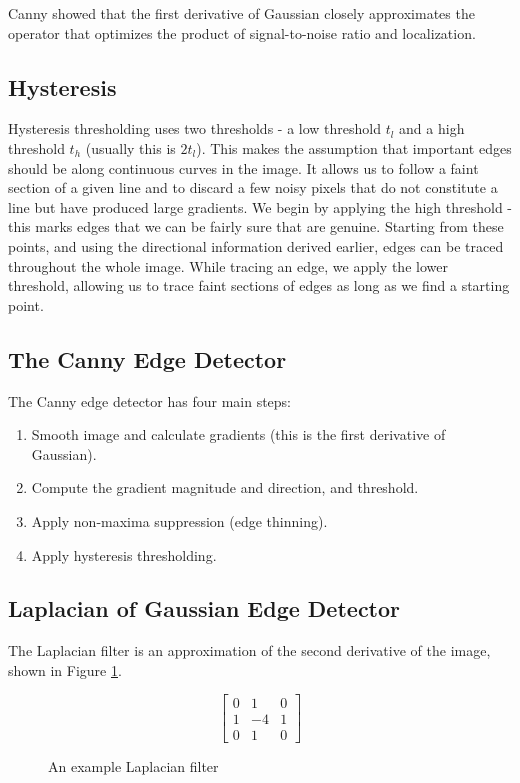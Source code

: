 \documentclass{article}
\begin{document}
	Canny showed that the first derivative of Gaussian closely approximates the operator that optimizes the product of signal-to-noise ratio and localization.

	\subsection{Hysteresis}
	Hysteresis thresholding uses two thresholds - a low threshold $t_{l}$ and a high threshold $t_{h}$ (usually this is $2t_{l}$). This makes the assumption that important edges should be along continuous curves in the image. It allows us to follow a faint section of a given line and to discard a few noisy pixels that do not constitute a line but have produced large gradients. We begin by applying the high threshold - this marks edges that we can be fairly sure that are genuine. Starting from these points, and using the directional information derived earlier, edges can be traced throughout the whole image. While tracing an edge, we apply the lower threshold, allowing us to trace faint sections of edges as long as we find a starting point.
	
	\subsection{The Canny Edge Detector}
	The Canny edge detector has four main steps:
	\begin{enumerate}
		\item Smooth image and calculate gradients (this is the first derivative of Gaussian).
		\item Compute the gradient magnitude and direction, and threshold.
		\item Apply non-maxima suppression (edge thinning).
		\item Apply hysteresis thresholding.
	\end{enumerate}

	\subsection{Laplacian of Gaussian Edge Detector}
	The Laplacian filter is an approximation of the second derivative of the image, shown in Figure  \ref{fig:laplacian filter}.
	\begin{figure}
			\begingroup
			\renewcommand*{\arraystretch}{1.7}	
			\centering
			\[ \begin{bmatrix} 0 & 1 & 0 \\
								1 & -4 & 1 \\
								0 & 1 & 0
			\end{bmatrix} \]
			\endgroup
			\caption{An example Laplacian filter}
			\label{fig:laplacian filter}
	\end{figure}
	
\end{document}
